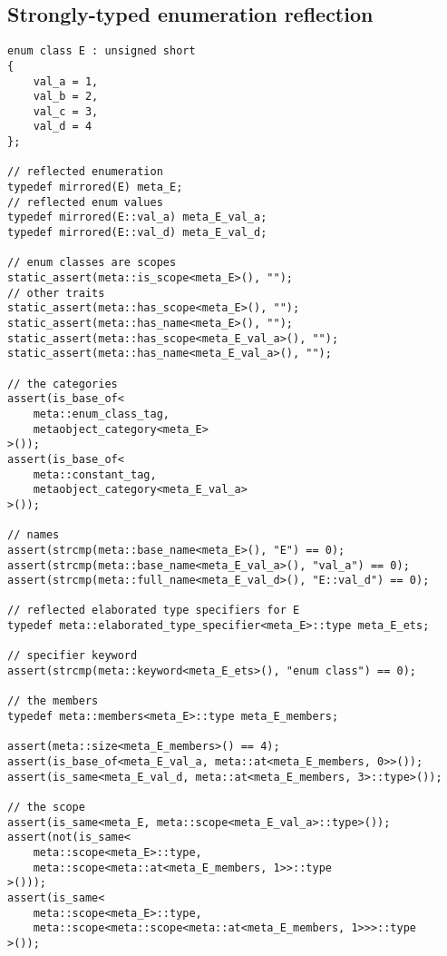 \subsection{Strongly-typed enumeration reflection}

\begin{verbatim}
enum class E : unsigned short
{
	val_a = 1,
	val_b = 2,
	val_c = 3,
	val_d = 4
};

// reflected enumeration
typedef mirrored(E) meta_E;
// reflected enum values
typedef mirrored(E::val_a) meta_E_val_a;
typedef mirrored(E::val_d) meta_E_val_d;

// enum classes are scopes
static_assert(meta::is_scope<meta_E>(), "");
// other traits
static_assert(meta::has_scope<meta_E>(), "");
static_assert(meta::has_name<meta_E>(), "");
static_assert(meta::has_scope<meta_E_val_a>(), "");
static_assert(meta::has_name<meta_E_val_a>(), "");

// the categories
assert(is_base_of<
	meta::enum_class_tag,
	metaobject_category<meta_E>
>());
assert(is_base_of<
	meta::constant_tag,
	metaobject_category<meta_E_val_a>
>());

// names
assert(strcmp(meta::base_name<meta_E>(), "E") == 0);
assert(strcmp(meta::base_name<meta_E_val_a>(), "val_a") == 0);
assert(strcmp(meta::full_name<meta_E_val_d>(), "E::val_d") == 0);

// reflected elaborated type specifiers for E
typedef meta::elaborated_type_specifier<meta_E>::type meta_E_ets;

// specifier keyword
assert(strcmp(meta::keyword<meta_E_ets>(), "enum class") == 0);

// the members
typedef meta::members<meta_E>::type meta_E_members;

assert(meta::size<meta_E_members>() == 4);
assert(is_base_of<meta_E_val_a, meta::at<meta_E_members, 0>>());
assert(is_same<meta_E_val_d, meta::at<meta_E_members, 3>::type>());

// the scope
assert(is_same<meta_E, meta::scope<meta_E_val_a>::type>());
assert(not(is_same<
	meta::scope<meta_E>::type,
	meta::scope<meta::at<meta_E_members, 1>>::type
>()));
assert(is_same<
	meta::scope<meta_E>::type,
	meta::scope<meta::scope<meta::at<meta_E_members, 1>>>::type
>());

\end{verbatim}
